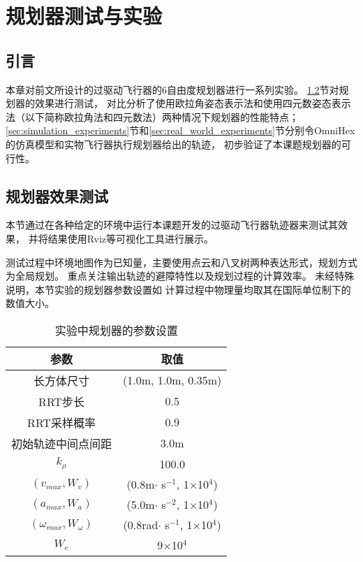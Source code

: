 
\chapter{规划器测试与实验}\label{chap:experiments}

\section{引言}\label{sec:intro_5}
本章对前文所设计的过驱动飞行器的6自由度规划器进行一系列实验。
\ref{sec:planner_performance}节对规划器的效果进行测试，
对比分析了使用欧拉角姿态表示法和使用四元数姿态表示法（以下简称欧拉角法和四元数法）两种情况下规划器的性能特点；
\ref{sec:simulation_experiments}节和\ref{sec:real_world_experiments}节分别令OmniHex的仿真模型和实物飞行器执行规划器给出的轨迹，
初步验证了本课题规划器的可行性。

\section{规划器效果测试}\label{sec:planner_performance}
本节通过在各种给定的环境中运行本课题开发的过驱动飞行器轨迹器来测试其效果，
并将结果使用Rviz\cite{kam2015rviz}等可视化工具进行展示。

测试过程中环境地图作为已知量，主要使用点云和八叉树两种表达形式，规划方式为全局规划。
重点关注输出轨迹的避障特性以及规划过程的计算效率。
未经特殊说明，本节实验的规划器参数设置如
计算过程中物理量均取其在国际单位制下的数值大小。

\begin{table}[htbp]
    \caption{实验中规划器的参数设置\label{tab:planner_parameter_setting}}
    \vspace{0.5em}\centering\wuhao
    \begin{tabular}{cc}
    \toprule[1.5pt]
    参数 & 取值\\
    \midrule[1pt]
    长方体尺寸 & (1.0m, 1.0m, 0.35m) \\
    RRT步长 & 0.5 \\ 
    RRT采样概率 & 0.9 \\
    初始轨迹中间点间距 & 3.0m \\
    $k_\rho$ & 100.0 \\
    $(v_{max}, W_v)$ & (0.8m$\cdot$ s$^{-1}$, 1$\times$10$^{4}$) \\
    $(a_{max}, W_a)$ & (5.0m$\cdot$ s$^{-2}$, 1$\times$10$^{4}$) \\
    $(\omega_{max}, W_\omega)$ & (0.8rad$\cdot$ s$^{-1}$, 1$\times$10$^{4}$) \\
    $W_c$ & 9$\times$10$^{4}$ \\
    \bottomrule[1.5pt]
    \end{tabular}
  \end{table}

